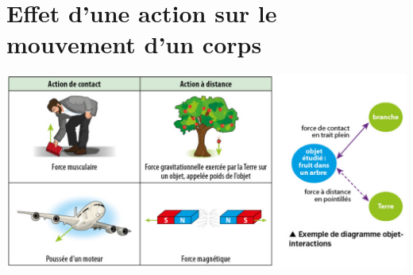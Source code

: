 \documentclass[12pt,a4paper]{article}
\begin{document}



\section{Effet d'une action sur le mouvement d'un corps}

%





	\begin{center}
		\includegraphics[scale=0.4]{ex_actions_doi}
	\end{center}

%
%		

%
%
%
\end{document}
